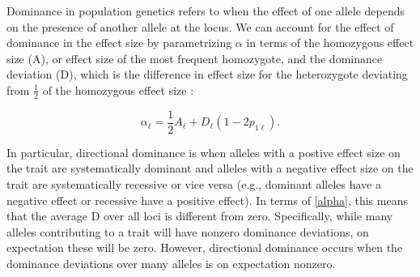 \documentclass[a4paper,12pt]{article}
\begin{document}

Dominance in population genetics refers to when the effect of one
allele depends on the presence of another allele at the locus. We can account for
the effect of dominance in the effect size by parametrizing $\alpha$
in terms of the homozygous effect size (A), or effect size of the most frequent homozygote, and the
dominance deviation (D), which is the difference in effect size for the heterozygote
deviating from $\frac{1}{2}$ of the homozygous effect size \cite{gillespie}:

\begin{equation}  
  \alpha_\ell = \frac{1}{2} A_\ell + D_\ell\left(1-2p_{1\ell}\right).
  \label{alpha}
\end{equation}

In particular, directional dominance is when alleles with a postive effect
size on the trait are systematically dominant and alleles with a
negative effect size on the trait are systematically recessive or vice
versa (e.g., dominant alleles have a negative effect or recessive have
a positive effect). In terms of \eqref{alpha}, this means that the
average D over all loci is different from zero. Specifically, while
many alleles contributing to a trait will have nonzero dominance
deviations, on expectation these will be zero. However, directional
dominance occurs when the dominance deviations over many alleles is on
expectation nonzero.
\end{document}
